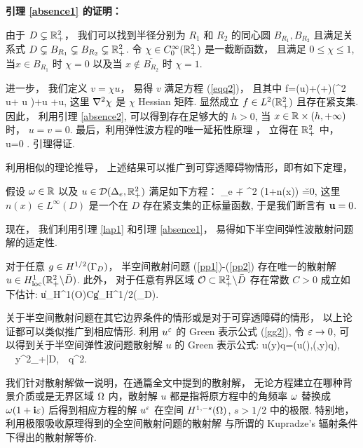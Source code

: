 {\noindent \bf 引理 \ref{absence1} 的证明：} 

由于 $D\subsetneq\mathbb{R}^2_+$， 我们可以找到半径分别为 $R_1$ 和 $R_2$ 的同心圆 $B_{R_1},B_{R_2}$ 且满足关系式 $D\subsetneq B_{R_1}\subsetneq B_{R_2}  \subsetneq \mathbb{R}^2_+$.  令 $\chi \in C_{0}^{\infty}(\mathbb{R}^2_+)$ 是一截断函数， 且满足 $0 \leq \chi \leq 1$,当$x\in B_{R_1}$ 时 $\chi=0$  以及当 $x\notin \overline{B_{R_2}}$ 时 $\chi=1$. 

进一步， 我们定义 $v=\chi u$，
易得 $v$ 满足方程 (\ref{eqq2})， 且其中
\ben
f=\sigma(u)\na\chi+(\lambda+\mu)(\na^2 \chi u+ \na u \na\chi)+\mu\Delta\chi u +\mu\div u\na\chi,
\een
 这里 $\nabla^2 \chi$ 是 $\chi$ Hessian 矩阵.  显然成立 $f\in L^2(\mathbb{R}^2_+)$ 且存在紧支集.  因此， 利用引理 \ref{absence2}, 可以得到存在足够大的 $h>0$, 当 $x\in \mathbb{R}\times(h,+\infty)$ 时， $u=v=0$.  最后，利用弹性波方程的唯一延拓性原理 \cite{Morassi2001STRONG}，
立得在 $\mathbb{R}^2_+$ 中， u=0 .  引理得证. 
\finproof

利用相似的理论推导， 上述结果可以推广到可穿透障碍物情形，即有如下定理，
\begin{lem}
	假设 $\omega\in \mathbb{R}$ 以及 $u\in \mathcal{D}(\Delta_e,\mathbb{R}^2_+)$ 满足如下方程： 
	\ben
	\De_e \u + \om^2 (1+n(x)) \u =0,
	\een
	这里 $n(x)\in L^{\infty}(D)$ 是一个在 $D$ 存在紧支集的正标量函数,
	于是我们断言有 $\mathbf{u}=0$.
\end{lem}


现在， 我们利用引理 \ref{lap1} 和引理 \ref{absence1}， 易得如下半空间弹性波散射问题解的适定性. 
\begin{thm} \label{thm:4.1}\label{lap2}
	对于任意 $g \in H^{1/2}(\Gamma_D)$， 半空间散射问题 (\ref{pp1})-(\ref{pp2})
	存在唯一的散射解 $u\in H^{1}_{\rm loc}(\mathbb{R}^2_+ \backslash \bar D)$. 此外， 对于任意有界区域 $\mathcal O\subset \mathbb{R}^2_+\backslash\bar D$ 存在常数 $C>0$ 成立如下估计:
	\ben
	\|u\|_{H^{1}(\mathcal O)}\le C\|g\|_{H^{1/2}(\Ga_D)}.
	\een
\end{thm}

关于半空间散射问题在其它边界条件的情形或是对于可穿透障碍的情形， 以上论证都可以类似推广到相应情形. 利用 $u^\varepsilon$ 的 Green 表示公式 (\ref{gg2}), 令 $\varepsilon\to 0$, 可以得到关于半空间弹性波问题散射解 $u$ 的 Green 表示公式: 
\be\label{g2}
u(y)\cdot q=\GG(u(\cdot),\N(\cdot,y)q), \ \ \forall y\in\R^2_+\bks\bar D,\ \ \forall q\in\R^2.
\ee
\begin{remark}
	我们针对散射解做一说明，在通篇全文中提到的散射解， 无论方程建立在哪种背景介质或是无界区域 $\Omega
	$ 内，散射解 $u$ 都是指将原方程中的角频率 $\omega$ 替换成 $\omega(1+\mathbf{i}\varepsilon)$ 后得到相应方程的解 $u^\varepsilon$ 在空间 $H^{1,-s}(\Omega)$, $s>1/2$ 中的极限. 特别地， 利用极限吸收原理得到的全空间散射问题的散射解 \cite{leis, cxz2016} 与所谓的 Kupradze's 辐射条件下得出的散射解等价. 
\end{remark}

